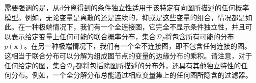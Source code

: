 \documentclass[../../main.tex]{subfiles}
\begin{document}
需要强调的是，从d分离得到的条件独立性适用于该特定有向图所描述的任何概率模型。例如，无论变量是离散的还是连续的，抑或是这些变量的组合，情况都是如此。在一种极端情况下，我们有一个全连接图，它完全不显示条件独立性，并且可以表示给定变量上任何可能的联合概率分布，集合$\mathcal{D}_F$将包含所有可能的分布$p(\mathbf{x})$。在另一种极端情况下，我们有一个全不连接图，即不包含任何连接的图。这相当于联合分布可以分解为组成图节点的变量的边缘分布的乘积。请注意，对于任何给定的图，集合$\mathcal{D}_F$都将包括除图所描述的分布外，还具有其他独立特性的任何分布。例如，一个全分解分布总能通过相应变量集上的任何图所隐含的过滤器。
\end{document}
